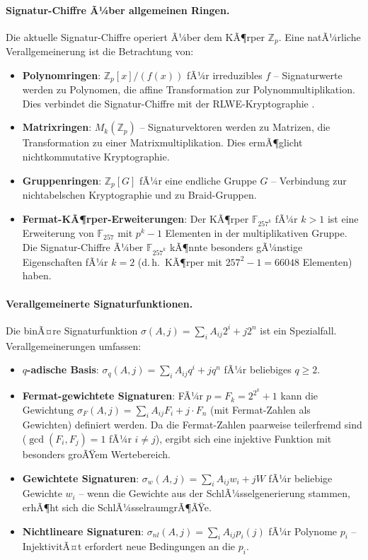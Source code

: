 ﻿\documentclass[a4paper,12pt]{scrreprt}
\theoremstyle{definition}
\begin{document}
\paragraph{Signatur-Chiffre Ã¼ber allgemeinen Ringen.}
Die aktuelle Signatur-Chiffre operiert Ã¼ber dem KÃ¶rper $\mathbb{Z}_p$. Eine natÃ¼rliche Verallgemeinerung ist die Betrachtung von:
\begin{itemize}
    \item \textbf{Polynomringen}: $\mathbb{Z}_p[x]/(f(x))$ fÃ¼r irreduzibles $f$ -- Signaturwerte werden zu Polynomen, die affine Transformation zur Polynommultiplikation. Dies verbindet die Signatur-Chiffre mit der RLWE-Kryptographie \cite{LPR10}.
    \item \textbf{Matrixringen}: $M_k(\mathbb{Z}_p)$ -- Signaturvektoren werden zu Matrizen, die Transformation zu einer Matrixmultiplikation. Dies ermÃ¶glicht nichtkommutative Kryptographie.
    \item \textbf{Gruppenringen}: $\mathbb{Z}_p[G]$ fÃ¼r eine endliche Gruppe $G$ -- Verbindung zur nichtabelschen Kryptographie und zu Braid-Gruppen.
    \item \textbf{Fermat-KÃ¶rper-Erweiterungen}: Der KÃ¶rper $\mathbb{F}_{257^k}$ fÃ¼r $k > 1$ ist eine Erweiterung von $\mathbb{F}_{257}$ mit $p^k - 1$ Elementen in der multiplikativen Gruppe. Die Signatur-Chiffre Ã¼ber $\mathbb{F}_{257^k}$ kÃ¶nnte besonders gÃ¼nstige Eigenschaften fÃ¼r $k = 2$ (d.\,h.\ KÃ¶rper mit $257^2 - 1 = 66048$ Elementen) haben.
\end{itemize}

\paragraph{Verallgemeinerte Signaturfunktionen.}
Die binÃ¤re Signaturfunktion $\sigma(A,j) = \sum_i A_{ij} 2^i + j2^n$ ist ein Spezialfall. Verallgemeinerungen umfassen:
\begin{itemize}
    \item \textbf{$q$-adische Basis}: $\sigma_q(A,j) = \sum_i A_{ij} q^i + jq^n$ fÃ¼r beliebiges $q \geq 2$.
    \item \textbf{Fermat-gewichtete Signaturen}: FÃ¼r $p = F_k = 2^{2^k}+1$ kann die Gewichtung $\sigma_{F}(A,j) = \sum_i A_{ij} F_i + j \cdot F_n$ (mit Fermat-Zahlen als Gewichten) definiert werden. Da die Fermat-Zahlen paarweise teilerfremd sind ($\gcd(F_i, F_j) = 1$ fÃ¼r $i \neq j$), ergibt sich eine injektive Funktion mit besonders groÃŸem Wertebereich.
    \item \textbf{Gewichtete Signaturen}: $\sigma_w(A,j) = \sum_i A_{ij} w_i + jW$ fÃ¼r beliebige Gewichte $w_i$ -- wenn die Gewichte aus der SchlÃ¼sselgenerierung stammen, erhÃ¶ht sich die SchlÃ¼sselraumgrÃ¶ÃŸe.
    \item \textbf{Nichtlineare Signaturen}: $\sigma_{nl}(A,j) = \sum_i A_{ij} p_i(j)$ fÃ¼r Polynome $p_i$ -- InjektivitÃ¤t erfordert neue Bedingungen an die $p_i$.
\end{itemize}
\end{document}
